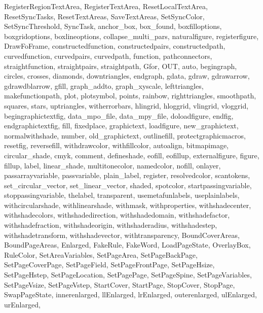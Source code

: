 {{        RegisterRegionTextArea, RegisterTextArea,%
        ResetLocalTextArea, ResetSyncTasks, ResetTextAreas,%
        SaveTextAreas, SetSyncColor, SetSyncThreshold,%
        SyncTask, anchor_box, box_found, boxfilloptions,%
        boxgridoptions, boxlineoptions, collapse_multi_pars,%
        naturalfigure, registerfigure, DrawFoFrame,%
        constructedfunction, constructedpairs,%
        constructedpath, curvedfunction, curvedpairs,%
        curvedpath, function, pathconnectors, straightfunction,%
        straightpairs, straightpath,%
        Gfor, OUT, auto, begingraph, circles, crosses, diamonds,%
        downtriangles, endgraph, gdata, gdraw, gdrawarrow,%
        gdrawdblarrow, gfill, graph_addto,%
        graph_xyscale, lefttriangles, makefunctionpath, plot,%
        plotsymbol, points, rainbow, righttriangles, smoothpath,%
        squares, stars, uptriangles, witherrorbars,%
        hlingrid, hloggrid, vlingrid, vloggrid,%
        begingraphictextfig, data_mpo_file,%
        data_mpy_file, doloadfigure, endfig,%
        endgraphictextfig, fill, fixedplace, graphictext,%
        loadfigure, new_graphictext, normalwithshade, number,%
        old_graphictext, outlinefill, protectgraphicmacros,%
        resetfig, reversefill, withdrawcolor, withfillcolor,%
        autoalign, bitmapimage, circular_shade, cmyk, comment,%
        defineshade, eofill, eofillup, externalfigure, figure,%
        fillup, label, linear_shade, multitonecolor, namedcolor,%
        nofill, onlayer, passarrayvariable, passvariable,%
        plain_label, register, resolvedcolor, scantokens,%
        set_circular_vector, set_linear_vector, shaded,%
        spotcolor, startpassingvariable, stoppassingvariable,%
        thelabel, transparent, usemetafunlabels,%
        useplainlabels, withcircularshade, withlinearshade,%
        withmask, withproperties, withshadecenter,%
        withshadecolors, withshadedirection, withshadedomain,%
        withshadefactor, withshadefraction, withshadeorigin,%
        withshaderadius, withshadestep, withshadetransform,%
        withshadevector, withtransparency,%
        BoundCoverAreas, BoundPageAreas, Enlarged, FakeRule,%
        FakeWord, LoadPageState, OverlayBox, RuleColor,%
        SetAreaVariables, SetPageArea, SetPageBackPage,%
        SetPageCoverPage, SetPageField, SetPageFrontPage,%
        SetPageHsize, SetPageHstep, SetPageLocation,%
        SetPagePage, SetPageSpine, SetPageVariables,%
        SetPageVsize, SetPageVstep, StartCover, StartPage,%
        StopCover, StopPage, SwapPageState, innerenlarged,%
        llEnlarged, lrEnlarged, outerenlarged, ulEnlarged, urEnlarged,%
}}
